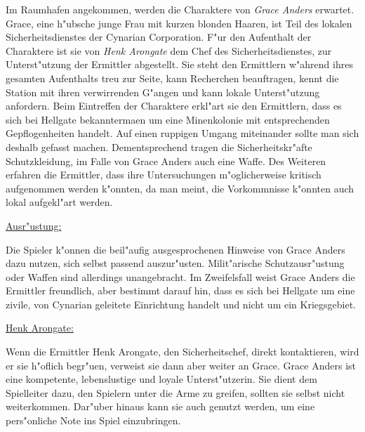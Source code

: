 Im Raumhafen angekommen, werden die Charaktere von \emph{Grace Anders} erwartet. Grace, eine h"ubsche junge Frau mit kurzen blonden Haaren, ist Teil des lokalen Sicherheitsdienstes der Cynarian Corporation. F"ur den Aufenthalt der Charaktere ist sie von \emph{Henk Arongate} dem Chef des Sicherheitsdienstes, zur Unterst"utzung der Ermittler abgestellt. Sie steht den Ermittlern w"ahrend ihres gesamten Aufenthalts treu zur Seite, kann Recherchen beauftragen, kennt die Station mit ihren verwirrenden G"angen und kann lokale Unterst"utzung anfordern. Beim Eintreffen der Charaktere erkl"art sie den Ermittlern, dass es sich bei Hellgate bekannterma\3en um eine Minenkolonie mit entsprechenden Gepflogenheiten handelt. Auf einen ruppigen Umgang miteinander sollte man sich deshalb gefasst machen. Dementsprechend tragen die Sicherheitskr"afte Schutzkleidung, im Falle von Grace Anders auch eine Waffe. Des Weiteren erfahren die Ermittler, dass ihre Untersuchungen m"oglicherweise kritisch aufgenommen werden k"onnten, da man meint, die Vorkommnisse k"onnten auch lokal aufgekl"art werden.

\begin{remarks}
	\underline{Ausr"ustung:}

	Die Spieler k"onnen die beil"aufig ausgesprochenen Hinweise von Grace Anders dazu nutzen, sich selbst passend auszur"usten. Milit"arische Schutzausr"ustung oder Waffen sind allerdings unangebracht. Im Zweifelsfall weist Grace Anders die Ermittler freundlich, aber bestimmt darauf hin, dass es sich bei Hellgate um eine zivile, von Cynarian geleitete Einrichtung handelt und nicht um ein Kriegsgebiet.

	\underline{Henk Arongate:}
	
	Wenn die Ermittler Henk Arongate, den Sicherheitschef, direkt kontaktieren, wird er sie h"oflich begr"u\3en, verweist sie dann aber weiter an Grace. Grace Anders ist eine kompetente, lebenslustige und loyale Unterst"utzerin. Sie dient dem Spielleiter dazu, den Spielern unter die Arme zu greifen, sollten sie selbst nicht weiterkommen. Dar"uber hinaus kann sie auch genutzt werden, um eine pers"onliche Note ins Spiel einzubringen.	
\end{remarks}


